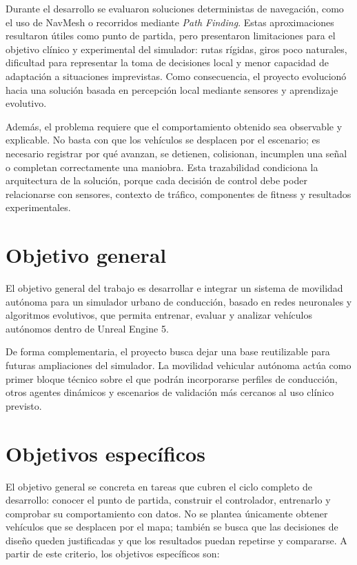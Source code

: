 Durante el desarrollo se evaluaron soluciones deterministas de navegación, como el uso de NavMesh o recorridos mediante \textit{Path Finding}. Estas aproximaciones resultaron útiles como punto de partida, pero presentaron limitaciones para el objetivo clínico y experimental del simulador: rutas rígidas, giros poco naturales, dificultad para representar la toma de decisiones local y menor capacidad de adaptación a situaciones imprevistas. Como consecuencia, el proyecto evolucionó hacia una solución basada en percepción local mediante sensores y aprendizaje evolutivo.

Además, el problema requiere que el comportamiento obtenido sea observable y explicable. No basta con que los vehículos se desplacen por el escenario; es necesario registrar por qué avanzan, se detienen, colisionan, incumplen una señal o completan correctamente una maniobra. Esta trazabilidad condiciona la arquitectura de la solución, porque cada decisión de control debe poder relacionarse con sensores, contexto de tráfico, componentes de fitness y resultados experimentales.

\section{Objetivo general}

El objetivo general del trabajo es desarrollar e integrar un sistema de movilidad autónoma para un simulador urbano de conducción, basado en redes neuronales y algoritmos evolutivos, que permita entrenar, evaluar y analizar vehículos autónomos dentro de Unreal Engine 5.

De forma complementaria, el proyecto busca dejar una base reutilizable para futuras ampliaciones del simulador. La movilidad vehicular autónoma actúa como primer bloque técnico sobre el que podrán incorporarse perfiles de conducción, otros agentes dinámicos y escenarios de validación más cercanos al uso clínico previsto.

\newpage
\section{Objetivos específicos}

El objetivo general se concreta en tareas que cubren el ciclo completo de desarrollo: conocer el punto de partida, construir el controlador, entrenarlo y comprobar su comportamiento con datos. No se plantea únicamente obtener vehículos que se desplacen por el mapa; también se busca que las decisiones de diseño queden justificadas y que los resultados puedan repetirse y compararse. A partir de este criterio, los objetivos específicos son:

